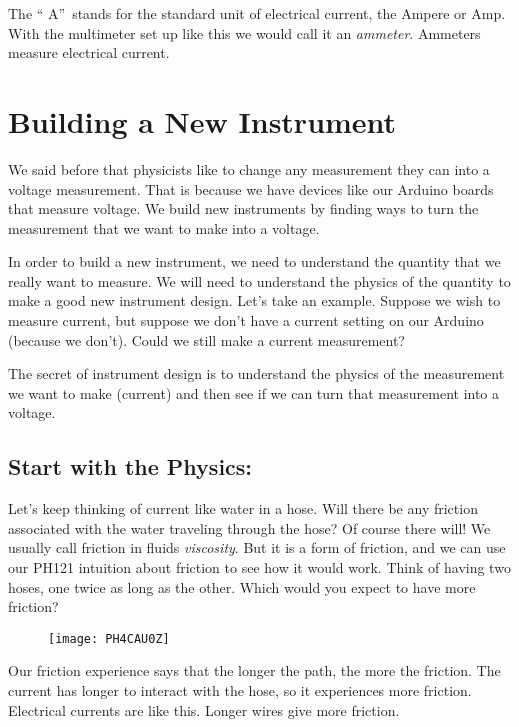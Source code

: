 The \textquotedblleft 
A\textquotedblright\ stands for the standard unit of electrical current, the
Ampere or Amp. With the multimeter set up like this we would call it an 
\emph{ammeter}. Ammeters measure electrical current.

\section{Building a New Instrument}

We said before that physicists like to change any measurement they can into
a voltage measurement. That is because we have devices like our Arduino
boards that measure voltage. We build new instruments by finding ways to
turn the measurement that we want to make into a voltage.

In order to build a new instrument, we need to understand the quantity that
we really want to measure. We will need to understand the physics of the
quantity to make a good new instrument design. Let's take an example.
Suppose we wish to measure current, but suppose we don't have a current
setting on our Arduino (because we don't). Could we still make a current
measurement?

The secret of instrument design is to understand the physics of the
measurement we want to make (current) and then see if we can turn that
measurement into a voltage.

\subsection{Start with the Physics:}

Let's keep thinking of current like water in a hose. Will there be any
friction associated with the water traveling through the hose? Of course
there will! We usually call friction in fluids \emph{viscosity}. But it is a
form of friction, and we can use our PH121 intuition about friction to see
how it would work. Think of having two hoses, one twice as long as the
other. Which would you expect to have more friction? 

\begin{figure}[h!]
	\centering
    \texttt{[image: PH4CAU0Z]}
\end{figure}

Our friction experience says that the longer the path, the more the
friction. The current has longer to interact with the hose, so it
experiences more friction. Electrical currents are like this. Longer wires
give more friction.

